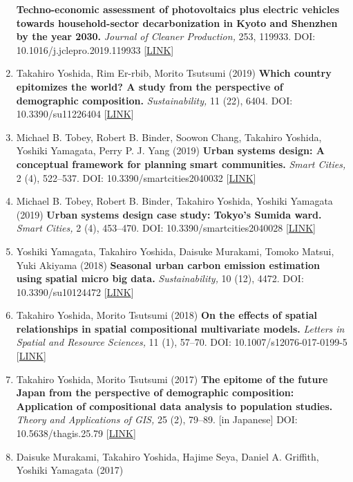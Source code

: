 \documentclass[
]{book}
\begin{document}
\begin{enumerate}
  \textbf{Techno-economic assessment of photovoltaics plus electric vehicles towards household-sector decarbonization in Kyoto and Shenzhen by the year 2030.}
  \emph{Journal of Cleaner Production,} 253, 119933.
  DOI: 10.1016/j.jclepro.2019.119933 {[}\href{https://doi.org/10.1016/j.jclepro.2019.119933}{LINK}{]}
\item
  Takahiro Yoshida, Rim Er-rbib, Morito Tsutsumi (2019)
  \textbf{Which country epitomizes the world? A study from the perspective of demographic composition.}
  \emph{Sustainability,} 11 (22), 6404.
  DOI: 10.3390/su11226404 {[}\href{https://www.mdpi.com/2071-1050/11/22/6404}{LINK}{]}
\item
  Michael B. Tobey, Robert B. Binder, Soowon Chang, Takahiro Yoshida, Yoshiki Yamagata, Perry P. J. Yang (2019)
  \textbf{Urban systems design: A conceptual framework for planning smart communities.}
  \emph{Smart Cities,} 2 (4), 522--537.
  DOI: 10.3390/smartcities2040032 {[}\href{https://www.mdpi.com/2624-6511/2/4/32}{LINK}{]}
\item
  Michael B. Tobey, Robert B. Binder, Takahiro Yoshida, Yoshiki Yamagata (2019)
  \textbf{Urban systems design case study: Tokyo's Sumida ward.}
  \emph{Smart Cities,} 2 (4), 453--470.
  DOI: 10.3390/smartcities2040028 {[}\href{https://www.mdpi.com/2624-6511/2/4/28}{LINK}{]}
\item
  Yoshiki Yamagata, Takahiro Yoshida, Daisuke Murakami, Tomoko Matsui, Yuki Akiyama (2018)
  \textbf{Seasonal urban carbon emission estimation using spatial micro big data.}
  \emph{Sustainability,} 10 (12), 4472.
  DOI: 10.3390/su10124472 {[}\href{https://www.mdpi.com/2071-1050/10/12/4472}{LINK}{]}
\item
  Takahiro Yoshida, Morito Tsutsumi (2018)
  \textbf{On the effects of spatial relationships in spatial compositional multivariate models.}
  \emph{Letters in Spatial and Resource Sciences,} 11 (1), 57--70.
  DOI: 10.1007/s12076-017-0199-5 {[}\href{https://link.springer.com/article/10.1007/s12076-017-0199-5}{LINK}{]}
\item
  Takahiro Yoshida, Morito Tsutsumi (2017)
  \textbf{The epitome of the future Japan from the perspective of demographic composition: Application of compositional data analysis to population studies.}
  \emph{Theory and Applications of GIS,} 25 (2), 79--89. {[}in Japanese{]}
  DOI: 10.5638/thagis.25.79 {[}\href{https://www.jstage.jst.go.jp/article/thagis/25/2/25_79/_article/-char/en}{LINK}{]}
\item
  Daisuke Murakami, Takahiro Yoshida, Hajime Seya, Daniel A. Griffith, Yoshiki Yamagata (2017)

\end{enumerate}
\end{document}
